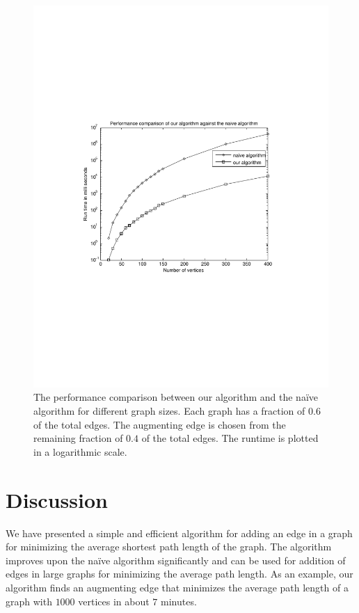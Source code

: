 \documentclass[10pt,letterpaper]{article}
\begin{document}
\begin{figure}[!t]
\centering
\includegraphics[scale=1.0, width=\columnwidth]{Fig3.pdf}
\vspace{-4cm}
\caption{The performance comparison between our algorithm and the na\"ive algorithm for different
         graph sizes. Each graph has a fraction of $0.6$ of the total edges. The augmenting edge is
         chosen from the remaining fraction of $0.4$ of the total edges. The runtime is plotted
         in a logarithmic scale.}
\label{fig2}
\end{figure}


\section*{Discussion}
We have presented a simple and efficient algorithm for adding an edge in a graph for minimizing the average shortest path length of the graph. The algorithm improves upon the na\"ive algorithm significantly and can be used 
for addition of edges in large graphs for minimizing the average path length. As an example, our algorithm 
finds an augmenting edge that minimizes the average path length of a graph with $1000$ vertices in about 
$7$ minutes.   
\end{document}
